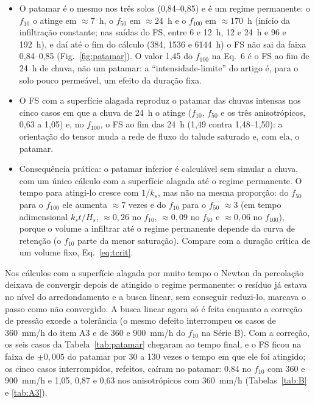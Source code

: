 \begin{itemize}
\item O patamar \'e o mesmo nos tr\^es solos (0,84--0,85) e \'e um regime permanente: o $f_{10}$ o atinge em
$\approx7$~h, o $f_{50}$ em $\approx24$~h e o $f_{100}$ em $\approx170$~h (in\'icio da infiltra\c{c}\~ao constante; nas
sa\'idas do FS, entre 6 e 12~h, 12 e 24~h e 96 e 192~h), e da\'i at\'e o fim do c\'alculo (384, 1536 e 6144~h) o FS
n\~ao sai da faixa 0,84--0,85 (Fig.~\ref{fig:patamar}). O valor 1,45 do $f_{100}$ na Eq.~6 \'e o FS ao fim de 24~h de
chuva, n\~ao um patamar: a ``intensidade-limite'' do artigo \'e, para o solo pouco perme\'avel, um efeito da
dura\c{c}\~ao fixa.
\item O FS com a superf\'icie alagada reproduz o patamar das chuvas intensas nos cinco casos em que a chuva de 24~h o
atinge ($f_{10}$, $f_{50}$ e os tr\^es anisotr\'opicos, 0,63 a 1,05) e, no $f_{100}$, o FS ao fim das 24~h (1,49 contra
1,48--1,50): a orienta\c{c}\~ao do tensor muda a rede de fluxo do talude saturado e, com ela, o patamar.
\item Consequ\^encia pr\'atica: o patamar inferior \'e calcul\'avel sem simular a chuva, com um \'unico c\'alculo com a
superf\'icie alagada at\'e o regime permanente. O tempo para atingi-lo cresce com $1/k_s$, mas n\~ao na mesma
propor\c{c}\~ao: do $f_{50}$ para o $f_{100}$ ele aumenta $\approx7$ vezes e do $f_{10}$ para o $f_{50}$ $\approx3$ (em
tempo adimensional $k_st/H_s$, $\approx0{,}26$ no $f_{10}$, $\approx0{,}09$ no $f_{50}$ e $\approx0{,}06$ no $f_{100}$),
porque o volume a infiltrar at\'e o regime permanente depende da curva de reten\c{c}\~ao (o $f_{10}$ parte da menor
satura\c{c}\~ao). Compare com a dura\c{c}\~ao cr\'itica de um volume fixo, Eq.~\eqref{eq:tcrit}.
\end{itemize}

Nos c\'alculos com a superf\'icie alagada por muito tempo o Newton da percola\c{c}\~ao deixava de convergir depois de
atingido o regime permanente: o res\'iduo j\'a estava no n\'ivel do arredondamento e a busca linear, sem conseguir
reduzi-lo, marcava o passo como n\~ao convergido. A busca linear agora s\'o \'e feita enquanto a corre\c{c}\~ao de
press\~ao excede a toler\^ancia (o mesmo defeito interrompeu os casos de 360~mm/h do item A3 e de 360 e 900~mm/h do
$f_{10}$ na S\'erie B). Com a corre\c{c}\~ao, os seis casos da Tabela~\ref{tab:patamar} chegaram ao tempo final, e o
FS ficou na faixa de $\pm0{,}005$ do patamar por 30 a 130 vezes o tempo em que ele foi atingido; os cinco casos
interrompidos, refeitos, ca\'iram no patamar: 0,84 no $f_{10}$ com 360 e 900~mm/h e 1,05, 0,87 e 0,63 nos
anisotr\'opicos com 360~mm/h (Tabelas~\ref{tab:B} e \ref{tab:A3}).
